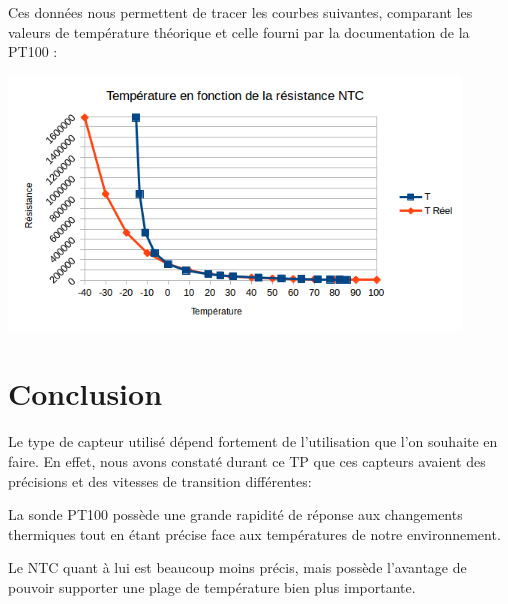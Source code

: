 \documentclass[a4paper,12pt]{article}
\begin{document}
			\par Ces données nous permettent de tracer les courbes suivantes, comparant les valeurs de température théorique et celle fourni par la documentation de la PT100 :
			\begin{center}
				\includegraphics[width=12cm]{../Images/GraphNTC.png}
			\end{center}

	\section{Conclusion}
	\label{sec:Conclusion}
		\par Le type de capteur utilisé dépend fortement de l'utilisation que l'on souhaite en faire.
		En effet, nous avons constaté durant ce TP que ces capteurs avaient des précisions et des vitesses de transition différentes:
		\par La sonde PT100 possède une grande rapidité de réponse aux changements thermiques tout en étant précise face aux températures de notre environnement.
		\par Le NTC quant à lui est beaucoup moins précis, mais possède l'avantage de pouvoir supporter une plage de température bien plus importante.
\end{document}
